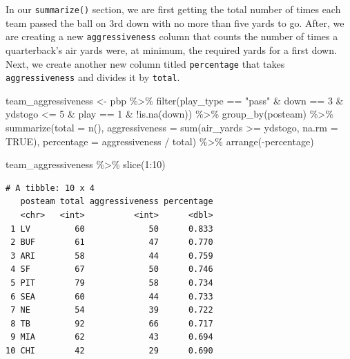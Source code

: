 \documentclass[
  letterpaper,
]{krantz}
\newenvironment{Shaded}{\begin{snugshade}}{\end{snugshade}}
\newcommand{\AttributeTok}[1]{\textcolor[rgb]{0.40,0.45,0.13}{#1}}
\newcommand{\ConstantTok}[1]{\textcolor[rgb]{0.56,0.35,0.01}{#1}}
\newcommand{\DecValTok}[1]{\textcolor[rgb]{0.68,0.00,0.00}{#1}}
\newcommand{\FunctionTok}[1]{\textcolor[rgb]{0.28,0.35,0.67}{#1}}
\newcommand{\NormalTok}[1]{\textcolor[rgb]{0.00,0.23,0.31}{#1}}
\newcommand{\OtherTok}[1]{\textcolor[rgb]{0.00,0.23,0.31}{#1}}
\newcommand{\SpecialCharTok}[1]{\textcolor[rgb]{0.37,0.37,0.37}{#1}}
\newcommand{\StringTok}[1]{\textcolor[rgb]{0.13,0.47,0.30}{#1}}
\begin{document}
In our \texttt{summarize()} section, we are first getting the total
number of times each team passed the ball on 3rd down with no more than
five yards to go. After, we are creating a new \texttt{aggressiveness}
column that counts the number of times a quarterback's air yards were,
at minimum, the required yards for a first down. Next, we create another
new column titled \texttt{percentage} that takes \texttt{aggressiveness}
and divides it by \texttt{total}.

\begin{Shaded}
\begin{Highlighting}[]
\NormalTok{team\_aggressiveness }\OtherTok{\textless{}{-}}\NormalTok{ pbp }\SpecialCharTok{\%\textgreater{}\%}
  \FunctionTok{filter}\NormalTok{(play\_type }\SpecialCharTok{==} \StringTok{"pass"} \SpecialCharTok{\&}
\NormalTok{           down }\SpecialCharTok{==} \DecValTok{3} \SpecialCharTok{\&}
\NormalTok{           ydstogo }\SpecialCharTok{\textless{}=} \DecValTok{5} \SpecialCharTok{\&}
\NormalTok{           play }\SpecialCharTok{==} \DecValTok{1} \SpecialCharTok{\&}
           \SpecialCharTok{!}\FunctionTok{is.na}\NormalTok{(down)) }\SpecialCharTok{\%\textgreater{}\%}
  \FunctionTok{group\_by}\NormalTok{(posteam) }\SpecialCharTok{\%\textgreater{}\%}
  \FunctionTok{summarize}\NormalTok{(}\AttributeTok{total =} \FunctionTok{n}\NormalTok{(),}
            \AttributeTok{aggressiveness =} \FunctionTok{sum}\NormalTok{(air\_yards }\SpecialCharTok{\textgreater{}=}\NormalTok{ ydstogo, }\AttributeTok{na.rm =} \ConstantTok{TRUE}\NormalTok{),}
            \AttributeTok{percentage =}\NormalTok{ aggressiveness }\SpecialCharTok{/}\NormalTok{ total) }\SpecialCharTok{\%\textgreater{}\%}
  \FunctionTok{arrange}\NormalTok{(}\SpecialCharTok{{-}}\NormalTok{percentage)}

\NormalTok{team\_aggressiveness }\SpecialCharTok{\%\textgreater{}\%}
  \FunctionTok{slice}\NormalTok{(}\DecValTok{1}\SpecialCharTok{:}\DecValTok{10}\NormalTok{)}
\end{Highlighting}
\end{Shaded}

\begin{verbatim}
# A tibble: 10 x 4
   posteam total aggressiveness percentage
   <chr>   <int>          <int>      <dbl>
 1 LV         60             50      0.833
 2 BUF        61             47      0.770
 3 ARI        58             44      0.759
 4 SF         67             50      0.746
 5 PIT        79             58      0.734
 6 SEA        60             44      0.733
 7 NE         54             39      0.722
 8 TB         92             66      0.717
 9 MIA        62             43      0.694
10 CHI        42             29      0.690
\end{verbatim}
\end{document}
